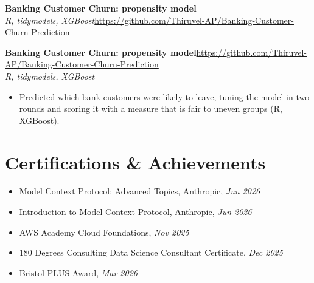 \documentclass[a4paper,11pt]{article}
\newcommand{\project}[3]{%
  \textbf{#1}\hfill#3\\ {\color{muted}\small\textit{#2}}\par}
\begin{document}
\else
\textbf{Banking Customer Churn: propensity model}\\ {\color{muted}\small\textit{R, tidymodels, XGBoost}}\hfill{\small\url{https://github.com/Thiruvel-AP/Banking-Customer-Churn-Prediction}}\par
\fi
\else
\project{Banking Customer Churn: propensity model}{R, tidymodels, XGBoost}{\url{https://github.com/Thiruvel-AP/Banking-Customer-Churn-Prediction}}
\fi
\begin{itemize}
  \item Predicted which bank customers were likely to leave, tuning the model in two rounds and scoring it with a measure that is fair to uneven groups (R, XGBoost).
\end{itemize}


\section{Certifications \& Achievements}
\begin{itemize}
  \item Model Context Protocol: Advanced Topics, Anthropic, \textit{Jun 2026}
  \item Introduction to Model Context Protocol, Anthropic, \textit{Jun 2026}
  \item AWS Academy Cloud Foundations, \textit{Nov 2025}
  \item 180 Degrees Consulting Data Science Consultant Certificate, \textit{Dec 2025}
  \item Bristol PLUS Award, \textit{Mar 2026}
\end{itemize}
\end{document}
